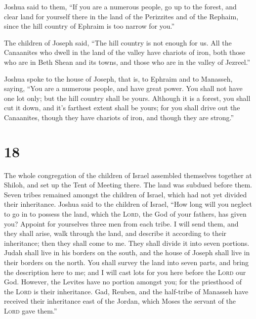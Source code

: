  Joshua said to them, ``If you are a numerous people, go
up to the forest, and clear land for yourself there in the land of the
Perizzites and of the Rephaim, since the hill country of Ephraim is too
narrow for you.''

 The children of Joseph said, ``The hill country is not
enough for us. All the Canaanites who dwell in the land of the valley
have chariots of iron, both those who are in Beth Shean and its towns,
and those who are in the valley of Jezreel.''

 Joshua spoke to the house of Joseph, that is, to Ephraim
and to Manasseh, saying, ``You are a numerous people, and have great
power. You shall not have one lot only;  but the hill
country shall be yours. Although it is a forest, you shall cut it down,
and it's farthest extent shall be yours; for you shall drive out the
Canaanites, though they have chariots of iron, and though they are
strong.''

\hypertarget{section-17}{%
\section{18}\label{section-17}}

 The whole congregation of the children of Israel
assembled themselves together at Shiloh, and set up the Tent of Meeting
there. The land was subdued before them.  Seven tribes
remained amongst the children of Israel, which had not yet divided their
inheritance.  Joshua said to the children of Israel, ``How
long will you neglect to go in to possess the land, which the
\textsc{Lord}, the God of your fathers, has given you? 
Appoint for yourselves three men from each tribe. I will send them, and
they shall arise, walk through the land, and describe it according to
their inheritance; then they shall come to me.  They shall
divide it into seven portions. Judah shall live in his borders on the
south, and the house of Joseph shall live in their borders on the north.
 You shall survey the land into seven parts, and bring the
description here to me; and I will cast lots for you here before the
\textsc{Lord} our God.  However, the Levites have no
portion amongst you; for the priesthood of the \textsc{Lord} is their
inheritance. Gad, Reuben, and the half-tribe of Manasseh have received
their inheritance east of the Jordan, which Moses the servant of the
\textsc{Lord} gave them.''

